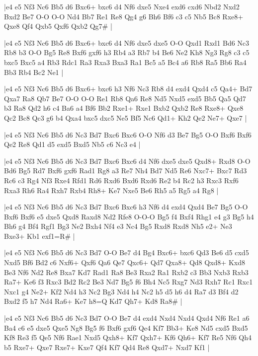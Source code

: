 \whitename{}
\blackname{}
\makegametitle
|e4 e5 Nf3 Nc6 Bb5 d6 Bxc6+ bxc6 d4 Nf6 dxe5 Nxe4 exd6 cxd6 Nbd2 Nxd2 Bxd2 Be7 O-O O-O Nd4 Bb7 Re1 Re8 Qg4 g6 Bh6 Bf6 c3 c5 Nb5 Bc8 Rxe8+ Qxe8 Qf4 Qxb5 Qxf6 Qxb2 Qg7\#  |

\whitename{}
\blackname{}
\makegametitle
|e4 e5 Nf3 Nc6 Bb5 d6 Bxc6+ bxc6 d4 Nf6 dxe5 dxe5 O-O Qxd1 Rxd1 Bd6 Nc3 Rb8 b3 O-O Bg5 Re8 Bxf6 gxf6 h3 Rb4 a3 Rb7 b4 Be6 Ne2 Kh8 Ng3 Rg8 c3 c5 bxc5 Bxc5 a4 Rb3 Rdc1 Ra3 Rxa3 Bxa3 Ra1 Bc5 a5 Bc4 a6 Rb8 Ra5 Bb6 Ra4 Bb3 Rb4 Bc2 Ne1  |

\whitename{}
\blackname{}
\makegametitle
|e4 e5 Nf3 Nc6 Bb5 d6 Bxc6+ bxc6 h3 Nf6 Nc3 Rb8 d4 exd4 Qxd4 c5 Qa4+ Bd7 Qxa7 Ra8 Qb7 Be7 O-O O-O Re1 Rb8 Qa6 Re8 Nd5 Nxd5 exd5 Bb5 Qa5 Qd7 b3 Ra8 Qd2 h6 c4 Ba6 a4 Bf6 Bb2 Rxe1+ Rxe1 Bxb2 Qxb2 Re8 Rxe8+ Qxe8 Qc2 Bc8 Qc3 g6 b4 Qxa4 bxc5 dxc5 Ne5 Bf5 Nc6 Qd1+ Kh2 Qe2 Ne7+ Qxe7  |

\whitename{}
\blackname{}
\makegametitle
|e4 e5 Nf3 Nc6 Bb5 d6 Nc3 Bd7 Bxc6 Bxc6 O-O Nf6 d3 Be7 Bg5 O-O Bxf6 Bxf6 Qe2 Re8 Qd1 d5 exd5 Bxd5 Nb5 c6 Nc3 e4  |

\whitename{}
\blackname{}
\makegametitle
|e4 e5 Nf3 Nc6 Bb5 d6 Nc3 Bd7 Bxc6 Bxc6 d4 Nf6 dxe5 dxe5 Qxd8+ Rxd8 O-O Bd6 Bg5 Rd7 Bxf6 gxf6 Rad1 Rg8 a3 Re7 Nh4 Bd7 Nd5 Re6 Nxc7+ Bxc7 Rd3 Rc6 c3 Rg4 Nf3 Rxe4 Rfd1 Rd6 Rxd6 Bxd6 Rxd6 Re2 b4 Rc2 h3 Rxc3 Rxf6 Rxa3 Rh6 Ra4 Rxh7 Rxb4 Rh8+ Ke7 Nxe5 Be6 Rh5 a5 Rg5 a4 Rg8  |

\whitename{}
\blackname{}
\makegametitle
|e4 e5 Nf3 Nc6 Bb5 d6 Nc3 Bd7 Bxc6 Bxc6 h3 Nf6 d4 exd4 Qxd4 Be7 Bg5 O-O Bxf6 Bxf6 e5 dxe5 Qxd8 Raxd8 Nd2 Rfe8 O-O-O Bg5 f4 Bxf4 Rhg1 e4 g3 Bg5 h4 Bh6 g4 Bf4 Rgf1 Bg3 Ne2 Bxh4 Nf4 e3 Nc4 Bg5 Rxd8 Rxd8 Nh5 e2+ Ne3 Bxe3+ Kb1 exf1=R\#  |

\whitename{}
\blackname{}
\makegametitle
|e4 e5 Nf3 Nc6 Bb5 d6 Nc3 Bd7 O-O Be7 d4 Bg4 Bxc6+ bxc6 Qd3 Be6 d5 cxd5 Nxd5 Bf6 Bd2 c6 Nxf6+ Qxf6 Qa6 Qe7 Qxc6+ Qd7 Qxa8+ Qd8 Qxd8+ Kxd8 Be3 Nf6 Nd2 Re8 Bxa7 Kd7 Rad1 Ra8 Be3 Rxa2 Ra1 Rxb2 c3 Bb3 Nxb3 Rxb3 Ra7+ Ke6 f3 Rxc3 Bd2 Rc2 Be3 Nd7 Bg5 f6 Bh4 Nc5 Rxg7 Nd3 Rxh7 Rc1 Rxc1 Nxc1 g4 Ne2+ Kf2 Nd4 h3 Nc2 Bg3 Nd4 h4 Nc2 h5 d5 h6 d4 Ra7 d3 Bf4 d2 Bxd2 f5 h7 Nd4 Ra6+ Ke7 h8=Q Kd7 Qh7+ Kd8 Ra8\#  |

\whitename{}
\blackname{}
\makegametitle
|e4 e5 Nf3 Nc6 Bb5 d6 Nc3 Bd7 O-O Be7 d4 exd4 Nxd4 Nxd4 Qxd4 Nf6 Re1 a6 Ba4 c6 e5 dxe5 Qxe5 Ng8 Bg5 f6 Bxf6 gxf6 Qe4 Kf7 Bb3+ Ke8 Nd5 cxd5 Bxd5 Kf8 Re3 f5 Qe5 Nf6 Rae1 Nxd5 Qxh8+ Kf7 Qxh7+ Kf6 Qh6+ Kf7 Re5 Nf6 Qh4 b5 Rxe7+ Qxe7 Rxe7+ Kxe7 Qf4 Kf7 Qd4 Re8 Qxd7+ Nxd7 Kf1  |


